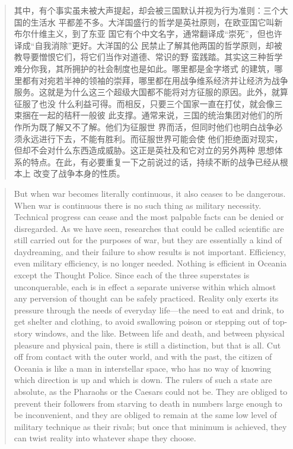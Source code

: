 \begin{paracol}{2}
\switchcolumn

\begin{quotation}
其中，有个事实虽未被大声提起，却会被三国默认并视为行为准则：三个大国的生活水
平都差不多。大洋国盛行的哲学是英社原则，在欧亚国它叫新布尔什维主义，到了东亚
国它有个中文名字，通常翻译成``崇死''，但也许译成``自我消除''更好。大洋国的公
民禁止了解其他两国的哲学原则，却被教导要憎恨它们，将它们当作对道德、常识的野
蛮践踏。其实这三种哲学难分你我，其所拥护的社会制度也是如此。哪里都是金字塔式
的建筑，哪里都有对宛若半神的领袖的崇拜，哪里都在用战争维系经济并让经济为战争
服务。这就是为什么这三个超级大国都不能将对方征服的原因。此外，就算征服了也没
什么利益可得。而相反，只要三个国家一直在打仗，就会像三束捆在一起的秸秆一般彼
此支撑。通常来说，三国的统治集团对他们的所作所为既了解又不了解。他们为征服世
界而活，但同时他们也明白战争必须永远进行下去，不能有胜利。而征服世界可能会使
他们拒绝面对现实，但却不会对什么东西造成威胁。这正是英社及和它对立的另外两种
思想体系的特点。在此，有必要重复一下之前说过的话，持续不断的战争已经从根本上
改变了战争本身的性质。
\end{quotation}

\switchcolumn*

\begin{quotation}
But when war becomes literally continuous, it also ceases to be
dangerous. When war is continuous there is no such thing as military
necessity. Technical progress can cease and the most palpable facts can
be denied or disregarded. As we have seen, researches that could be
called scientific are still carried out for the purposes of war, but
they are essentially a kind of daydreaming, and their failure to show
results is not important. Efficiency, even military efficiency, is no
longer needed. Nothing is efficient in Oceania except the Thought
Police. Since each of the three superstates is unconquerable, each is in
effect a separate universe within which almost any perversion of thought
can be safely practiced. Reality only exerts its pressure through the
needs of everyday life---the need to eat and drink, to get shelter and
clothing, to avoid swallowing poison or stepping out of top-story
windows, and the like. Between life and death, and between physical
pleasure and physical pain, there is still a distinction, but that is
all. Cut off from contact with the outer world, and with the past, the
citizen of Oceania is like a man in interstellar space, who has no way
of knowing which direction is up and which is down. The rulers of such a
state are absolute, as the Pharaohs or the Caesars could not be. They
are obliged to prevent their followers from starving to death in numbers
large enough to be inconvenient, and they are obliged to remain at the
same low level of military technique as their rivals; but once that
minimum is achieved, they can twist reality into whatever shape they
choose.
\end{quotation}


\end{paracol}
